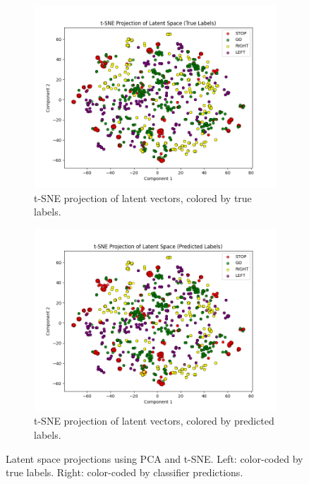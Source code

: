 \begin{figure}[htbp]
    \centering
    \begin{subfigure}[b]{0.49\textwidth}
        \includegraphics[width=\textwidth]{img/vae_results/tsne_latent_space_true_labels.png}
        \caption{t-SNE projection of latent vectors, colored by true labels.}
        \label{fig:tsne_true}
    \end{subfigure}
    \hfill
    \begin{subfigure}[b]{0.49\textwidth}
        \includegraphics[width=\textwidth]{img/vae_results/tsne_latent_space_predicted_labels.png}
        \caption{t-SNE projection of latent vectors, colored by predicted labels.}
        \label{fig:tsne_pred}
    \end{subfigure}
    \caption{Latent space projections using PCA and t-SNE. Left: color-coded by true labels. Right: color-coded by classifier predictions.}
    \label{fig:latent_space_visualizations}
\end{figure}

